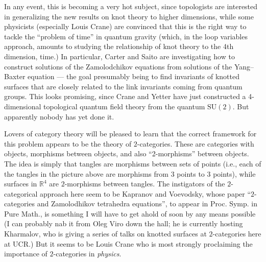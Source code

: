 \documentclass[12pt]{article}
\def\tightlist{}
\renewcommand{\texttt}[1]{%
  \begingroup
  \ttfamily
  \begingroup\lccode`~=`/\lowercase{\endgroup\def~}{/\discretionary{}{}{}}%
  \begingroup\lccode`~=`[\lowercase{\endgroup\def~}{[\discretionary{}{}{}}%
  \begingroup\lccode`~=`.\lowercase{\endgroup\def~}{.\discretionary{}{}{}}%
  \catcode`/=\active\catcode`[=\active\catcode`.=\active
  \scantokens{#1\noexpand}%
  \endgroup
}
\begin{document}
In any event, this is becoming a very hot subject, since topologists are
interested in generalizing the new results on knot theory to higher
dimensions, while some physicists (especially Louis Crane) are convinced
that this is the right way to tackle the ``problem of time'' in quantum
gravity (which, in the loop variables approach, amounts to studying the
relationship of knot theory to the 4th dimension, time.) In particular,
Carter and Saito are investigating how to construct solutions of the
Zamolodchikov equations from solutions of the Yang--Baxter equation ---
the goal presumably being to find invariants of knotted surfaces that
are closely related to the link invariants coming from quantum groups.
This looks promising, since Crane and Yetter have just constructed a
4-dimensional topological quantum field theory from the quantum
\(\mathrm{SU}(2)\). But apparently nobody has yet done it.

Lovers of category theory will be pleased to learn that the correct
framework for this problem appears to be the theory of \(2\)-categories.
These are categories with objects, morphisms between objects, and also
``2-morphisms'' between objects. The idea is simply that tangles are
morphisms between sets of points (i.e., each of the tangles in the
picture above are morphisms from 3 points to 3 points), while surfaces
in \(\mathbb{R}^4\) are \(2\)-morphisms between tangles. The instigators
of the \(2\)-categorical approach here seem to be Kapranov and
Voevodsky, whose paper ``\(2\)-categories and Zamolodhikov tetrahedra
equations'', to appear in Proc. Symp. in Pure Math., is something I will
have to get ahold of soon by any means possible (I can probably nab it
from Oleg Viro down the hall; he is currently hosting Kharmalov, who is
giving a series of talks on knotted surfaces at \(2\)-categories here at
UCR.) But it seems to be Louis Crane who is most strongly proclaiming
the importance of \(2\)-categories in \emph{physics}.

\end{document}
